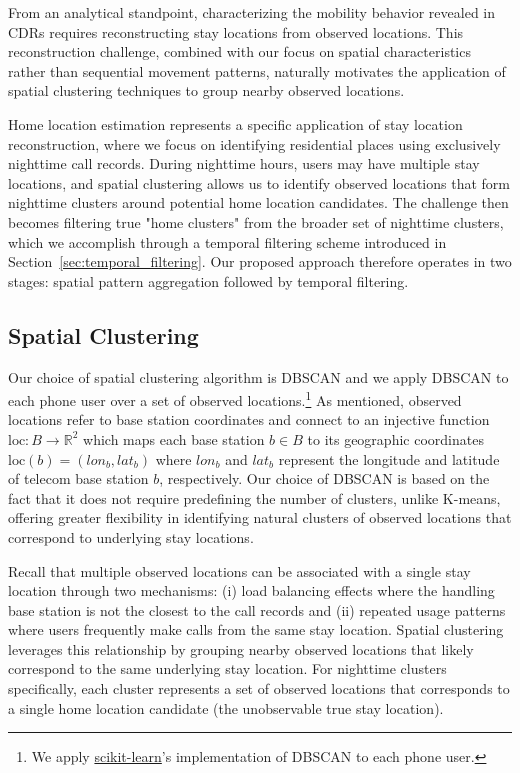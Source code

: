 From an analytical standpoint, characterizing the mobility behavior revealed in CDRs requires reconstructing stay locations from observed locations.
This reconstruction challenge, combined with our focus on spatial characteristics rather than sequential movement patterns, naturally motivates the application of spatial clustering techniques to group nearby observed locations.

Home location estimation represents a specific application of stay location reconstruction, where we focus on identifying residential places using exclusively nighttime call records.
During nighttime hours, users may have multiple stay locations, and spatial clustering allows us to identify observed locations that form nighttime clusters around potential home location candidates.
The challenge then becomes filtering true "home clusters" from the broader set of nighttime clusters, which we accomplish through a temporal filtering scheme introduced in Section~\ref{sec:temporal_filtering}.
Our proposed approach therefore operates in two stages: spatial pattern aggregation followed by temporal filtering.


\subsection{Spatial Clustering}\label{sec:spatial_clustering}
Our choice of spatial clustering algorithm is DBSCAN and we apply DBSCAN to each phone user over a set of observed locations.\footnote{We apply \href{https://scikit-learn.org/stable/modules/generated/sklearn.cluster.DBSCAN.html}{scikit-learn}'s implementation of DBSCAN to each phone user.}
As mentioned, observed locations refer to base station coordinates and connect to an injective function $\text{loc}: B \rightarrow \mathbb{R}^2$ which maps each base station $b \in B$ to its geographic coordinates $\text{loc}(b) = (lon_b, lat_b)$ where $lon_b$ and $lat_b$ represent the longitude and latitude of telecom base station $b$, respectively.
Our choice of DBSCAN is based on the fact that it does not require predefining the number of clusters, unlike K-means, offering greater flexibility in identifying natural clusters of observed locations that correspond to underlying stay locations.

Recall that multiple observed locations can be associated with a single stay location through two mechanisms: (i) load balancing effects where the handling base station is not the closest to the call records and (ii) repeated usage patterns where users frequently make calls from the same stay location.
Spatial clustering leverages this relationship by grouping nearby observed locations that likely correspond to the same underlying stay location.
For nighttime clusters specifically, each cluster represents a set of observed locations that corresponds to a single home location candidate (the unobservable true stay location).


